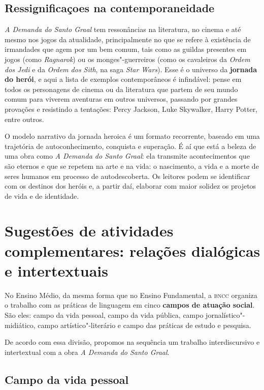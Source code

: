 \documentclass{extarticle}
\begin{document}
\subsection{Ressignificaçoes na contemporaneidade}

\emph{A Demanda do Santo Graal} tem ressonâncias na literatura, no
cinema e até mesmo nos jogos da atualidade, principalmente no que se
refere à existência de irmandades que agem por um bem comum, tais como
as guildas presentes em jogos (como \emph{Ragnarok}) ou os
monges"-guerreiros (como os cavaleiros da \emph{Ordem dos Jedi} e da
\emph{Ordem dos Sith}, na saga \emph{Star Wars}). Esse é o universo da
\textbf{jornada do herói}, e aqui a lista de exemplos contemporâneos é
infindável: pense em todos os personagens de cinema ou da literatura que
partem de seu mundo comum para viverem aventuras em outros universos,
passando por grandes provações e resistindo a tentações: Percy Jackson,
Luke Skywalker, Harry Potter, entre outros.

O modelo narrativo da jornada heroica é um formato recorrente, baseado
em uma trajetória de autoconhecimento, conquista e superação. É aí que
está a beleza de uma obra como \emph{A Demanda do Santo Graal}: ela
transmite acontecimentos que são eternos e que se repetem na arte e na
vida: o nascimento, a vida e a morte de seres humanos em processo de
autodescoberta. Os leitores podem se identificar com os destinos dos
heróis e, a partir daí, elaborar com maior solidez os projetos de vida e
de identidade.

\section{Sugestões de atividades complementares: relações dialógicas e intertextuais}


No Ensino Médio, da mesma forma que no Ensino Fundamental, a \textsc{bncc}
organiza o trabalho com as práticas de linguagem em cinco \textbf{campos
de atuação social}. São eles: campo da vida pessoal, campo da vida
pública, campo jornalístico"-midiático, campo artístico"-literário e campo
das práticas de estudo e pesquisa.

De acordo com essa divisão, propomos na sequência um trabalho
interdiscursivo e intertextual com a obra \emph{A Demanda do Santo
Graal}.

\subsection{Campo da vida pessoal}
\end{document}

